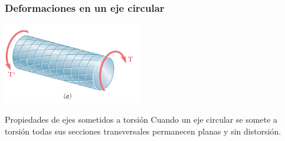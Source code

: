 \documentclass{beamer}
\begin{document}
\begin{frame}
\justifying
\frametitle{Deformaciones en un eje circular}

\begin{center}
\includegraphics[width=0.45\textwidth]{img/shaft_deformations.PNG}
\end{center}

\begin{informacion}{Propiedades de ejes sometidos a torsión}
Cuando un eje circular se somete a torsión todas sus secciones transversales permanecen planas y 
sin distorsión.
\end{informacion}

\end{frame}
\end{document}
